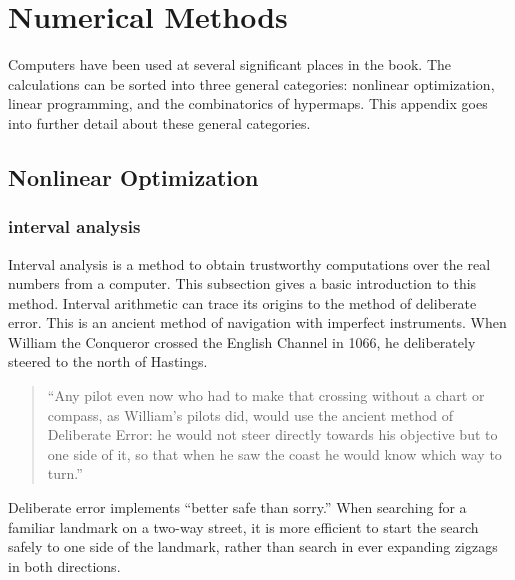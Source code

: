 %
\chapter{Numerical Methods}

Computers have been used at several significant places in the book.
The calculations can be sorted into three general categories:
nonlinear optimization, linear programming, and the combinatorics of
hypermaps. This appendix goes into further detail about these general
categories.


\section{Nonlinear Optimization}

\subsection{interval analysis}%
\label{sec:bounds-simplex}

Interval analysis is a method to obtain trustworthy computations over
the real numbers from a computer.  This subsection gives a basic
introduction to this method.  Interval arithmetic can trace its
origins to the method of deliberate error.  This is an ancient method
of navigation with imperfect instruments.  When William the Conqueror
crossed the English Channel in 1066, he deliberately steered to the
north of Hastings.

\begin{quote}
  ``Any pilot even now who had to make that crossing without a chart
  or compass, as William's pilots did, would use the ancient method of
  Deliberate Error: he would not steer directly towards his objective
  but to one side of it, so that when he saw the coast he would know
  which way to turn.'' \cite[p81]{How81}
\end{quote}

Deliberate error implements ``better safe than sorry.''
When searching for a familiar landmark
on a two-way street, it is more efficient  
to start the search safely to one side of the landmark, 
rather than search in ever
expanding zigzags in both directions.  


